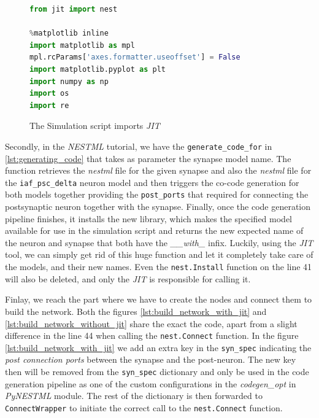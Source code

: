 \begin{figure}[ht!]
\centering
\begin{lstlisting}[language=Python, label=lst:imports_with_jit, caption={The Simulation script imports with JIT}]
from jit import nest

%matplotlib inline
import matplotlib as mpl
mpl.rcParams['axes.formatter.useoffset'] = False
import matplotlib.pyplot as plt
import numpy as np
import os
import re
\end{lstlisting}
\caption{The Simulation script imports \emph{JIT}}
\end{figure}

Secondly, in the \emph{NESTML} tutorial, we have the \texttt{generate\_code\_for} in \autoref{lst:generating_code} that takes as parameter the synapse model name. The function retrieves the \emph{nestml} file for the given synapse and also the \emph{nestml} file for the \texttt{iaf\_psc\_delta} neuron model and then triggers the co-code generation for both models together providing the \texttt{post\_ports} that required for connecting the postsynaptic neuron together with the synapse. Finally, once the code generation pipeline finishes, it installs the new library, which makes the specified model available for use in the simulation script and returns the new expected name of the neuron and synapse that both have the \emph{\_\_with\_} infix. Luckily, using the \emph{JIT} tool, we can simply get rid of this huge function and let it completely take care of the models, and their new names. Even the \texttt{nest.Install} function on the line 41 will also be deleted, and only the \emph{JIT} is responsible for calling it.



Finlay, we reach the part where we have to create the nodes and connect them to build the network. Both the figures \autoref{lst:build_network_with_jit} and \autoref{lst:build_network_without_jit} share the exact the code, apart from a slight difference in the line 44 when calling the \texttt{nest.Connect} function. In the figure \autoref{lst:build_network_with_jit} we add an extra key in the \texttt{syn\_spec} indicating the \emph{post connection ports} between the synapse and the post-neuron. The new key then will be removed from the \texttt{syn\_spec} dictionary and only be used in the code generation pipeline as one of the custom configurations in the \emph{codegen\_opt} in \emph{PyNESTML} module. The rest of the dictionary is then forwarded to \texttt{ConnectWrapper} to initiate the correct call to the \texttt{nest.Connect} function.

